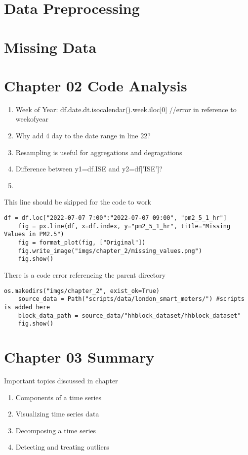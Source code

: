 \documentclass{article}
\begin{document}
\section{Data Preprocessing}
\section{Missing Data}
\section{Chapter 02 Code Analysis}
\begin{enumerate}
    \item Week of Year: {df.date.dt.isocalendar().week.iloc[0]} //error in reference to weekofyear
    \item Why add 4 day to the date range in line 22?
    \item Resampling is useful for aggregations and degragations
    \item Difference between y1=df.ISE and y2=df['ISE']?
    \item 
\end{enumerate}

This line should be skipped for the code to work
\lstset{language=Python}
\begin{lstlisting}[frame=single]
    df = df.loc["2022-07-07 7:00":"2022-07-07 09:00", "pm2_5_1_hr"]
    fig = px.line(df, x=df.index, y="pm2_5_1_hr", title="Missing Values in PM2.5")
    fig = format_plot(fig, ["Original"])
    fig.write_image("imgs/chapter_2/missing_values.png")
    fig.show()
\end{lstlisting}

There is a code error referencing the parent directory
\begin{lstlisting}[frame=single]
    os.makedirs("imgs/chapter_2", exist_ok=True)
    source_data = Path("scripts/data/london_smart_meters/") #scripts is added here
    block_data_path = source_data/"hhblock_dataset/hhblock_dataset"
    fig.show()
\end{lstlisting}


\section{Chapter 03 Summary}
Important topics discussed in chapter
\begin{enumerate}
    \item Components of a time series
    \item Visualizing time series data
    \item Decomposing a time series
    \item Detecting and treating outliers
\end{enumerate}
\end{document}
